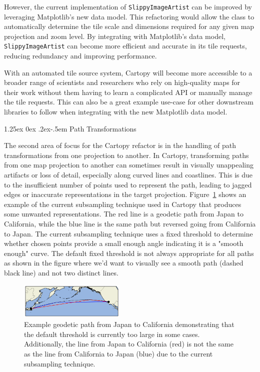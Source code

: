 \documentclass[12pt]{article}
\makeatletter
\numberwithin{page}{section}
\renewcommand{\paragraph}{%
  \@startsection{paragraph}{4}%
  {\z@}{1.25ex \@plus 0ex \@minus .2ex}{-.5em}%
  {\normalfont\normalsize\itshape\bfseries}%
}
\makeatother
\begin{document}
However, the current implementation of \texttt{SlippyImageArtist} can be improved by leveraging
Matplotlib's new data model. This refactoring would allow the class to automatically determine
the tile scale and dimensions required for any given map projection and zoom level. By integrating
with Matplotlib's data model, \texttt{SlippyImageArtist} can become more efficient and accurate in
its tile requests, reducing redundancy and improving performance.

With an automated tile source system, Cartopy will become more accessible to a broader range of
scientists and researchers who rely on high-quality maps for their work without them having to learn
a complicated API or manually manage the tile requests. This can also be a great example use-case for other
downstream libraries to follow when integrating with the new Matplotlib data model.

\paragraph{Path Transformations}

The second area of focus for the Cartopy refactor is in the handling of path transformations from
one projection to another. In Cartopy, transforming paths from one map projection to another can
sometimes result in visually unappealing artifacts or loss of detail,
especially along curved lines and coastlines. This is due to the insufficient
number of points used to represent the path, leading to jagged edges or inaccurate
representations in the target projection.
Figure~\ref{fig:cartopy_interpolation} shows an example of the current subsampling technique
used in Cartopy that produces some unwanted representations.
The red line is a geodetic path from Japan to California, while the blue line
is the same path but reversed going from California to Japan. The current subsampling technique
uses a fixed threshold to determine whether chosen points provide a small enough angle indicating
it is a "smooth enough" curve. The default fixed threshold is not always appropriate for all
paths as shown in the figure where we'd want to visually see a smooth path (dashed black line) and not two distinct lines.

\begin{figure}
  \includegraphics[width=0.45\textwidth]{supplemental/cartopy_interpolation}
  \caption{\small Example geodetic path from Japan to California demonstrating
  that the default threshold is currently too large in some cases. Additionally,
  the line from Japan to California (red) is not the same as the line from
  California to Japan (blue) due to the current subsampling technique.}
  \label{fig:cartopy_interpolation}
\end{figure}
\end{document}
